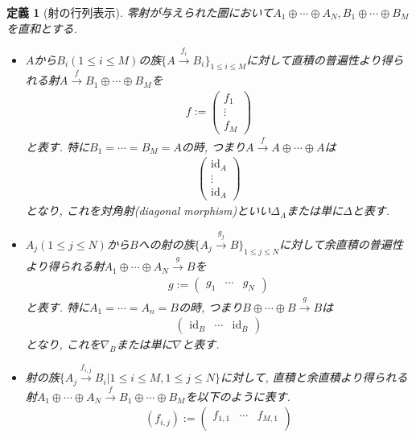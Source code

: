 \documentclass[a4paper,12pt]{ltjsarticle}
\theoremstyle{break}
\newtheorem{defn}[thm]{定義}
\newcommand{\xr}[1]{\xrightarrow{#1}}
\newcommand{\id}{\mathrm{id}}
\newcommand{\opl}{\oplus}
\numberwithin{equation}{section}
\begin{document}
\begin{defn}[射の行列表示]
  零射が与えられた圏において$A_1 \opl \cdots \opl A_N, B_1 \opl \cdots \opl B_M$を直和とする. 
  \begin{itemize}
    \item $A$から$B_i(1 \leq i \leq M)$の族$\{ A \xr{f_i} B_i \}_{1 \leq i \leq M}$に対して直積の普遍性より得られる射$A \xr{f} B_1 \opl \cdots \opl B_M$を
    \begin{align*}
      f :=
      \begin{pmatrix}
        f_1 \\
        \vdots \\
        f_M
      \end{pmatrix}
    \end{align*}
    と表す. 
    特に$B_1= \cdots = B_M=A$の時, つまり$A \xr{f} A \opl \cdots \opl A$は
    \begin{align*}
      \begin{pmatrix}
        \id_A \\
        \vdots \\
        \id_A
      \end{pmatrix}
    \end{align*}
    となり, これを対角射(diagonal morphism)といい$\Delta_A$または単に$\Delta$と表す. 
    \item $A_j(1 \leq j \leq N)$から$B$への射の族$\{ A_j \xr{g_j} B \}_{1 \leq j \leq N}$に対して余直積の普遍性より得られる射$A_1 \opl \cdots \opl A_N \xr{g} B$を
    \begin{align*}
      g :=
      \begin{pmatrix}
        g_1 & \cdots & g_N
      \end{pmatrix}
    \end{align*}
    と表す. 
    特に$A_1= \cdots =A_n=B$の時, つまり$B \opl \cdots \opl B \xr{g} B$は
    \begin{align*}
      \begin{pmatrix}
        \id_B & \cdots & \id_B
      \end{pmatrix} 
    \end{align*}
    となり, これを$\nabla_B$または単に$\nabla$と表す. 
    \item 射の族$\{ A_j \xr{f_{i,j}} B_i | 1 \leq i \leq M, 1 \leq j \leq N\}$に対して, 直積と余直積より得られる射$A_1 \opl \cdots \opl A_N \xr{f} B_1 \opl \cdots \opl B_M$を以下のように表す. 
    \begin{align*}
      (f_{i,j}) := 
      \begin{pmatrix}
        f_{1,1} & \cdots & f_{M,1} \\

\end{pmatrix}
\end{align*}
\end{itemize}
\end{defn}
\end{document}
